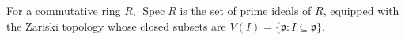 
For a commutative ring $R$, $\operatorname{Spec}R$ is the set of prime ideals of $R$, equipped with the Zariski topology whose closed subsets are $V(I)=\{\mathfrak p:I\subseteq\mathfrak p\}$.
